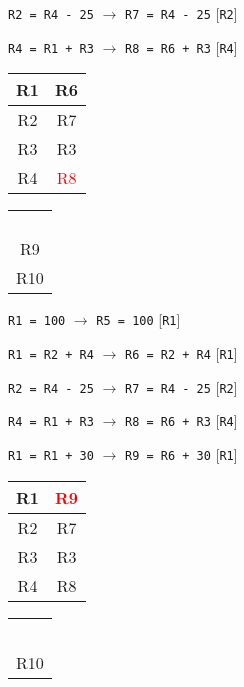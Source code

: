 \documentclass[12pt]{article}
\begin{document}
\begin{enumerate}
			\centerline{\texttt{R2 = R4 - 25} $\rightarrow$ \texttt{R7 = R4 - 25} [\texttt{R2}]}
			\centerline{\texttt{R4 = R1 + R3} $\rightarrow$ \texttt{R8 = R6 + R3} [\texttt{R4}]}
			\begin{table}[H]
				\centering
				\begin{tabular}{|c|c|}
					\hline R1 & R6\\ \hline R2 & R7\\ \hline R3 & R3\\ \hline R4 & \textcolor{red}{R8}\\ \hline
				\end{tabular}
				\hspace{5em}
				\begin{tabular}{|c|}
					\hline \\ \\ \\ \\ R9\\ R10\\ \hline
				\end{tabular}
			\end{table}
			\centerline{\texttt{R1 = 100} $\rightarrow$ \texttt{R5 = 100} [\texttt{R1}]}
			\centerline{\texttt{R1 = R2 + R4} $\rightarrow$ \texttt{R6 = R2 + R4} [\texttt{R1}]}
			\centerline{\texttt{R2 = R4 - 25} $\rightarrow$ \texttt{R7 = R4 - 25} [\texttt{R2}]}
			\centerline{\texttt{R4 = R1 + R3} $\rightarrow$ \texttt{R8 = R6 + R3} [\texttt{R4}]}
			\centerline{\texttt{R1 = R1 + 30} $\rightarrow$ \texttt{R9 = R6 + 30} [\texttt{R1}]}
			\begin{table}[H]
				\centering
				\begin{tabular}{|c|c|}
					\hline R1 & \textcolor{red}{R9}\\ \hline R2 & R7\\ \hline R3 & R3\\ \hline R4 & R8\\ \hline
				\end{tabular}
				\hspace{5em}
				\begin{tabular}{|c|}
					\hline \\ \\ \\ \\ \\ R10\\ \hline 
				\end{tabular}
			\end{table}
	\end{enumerate}
\end{document}
